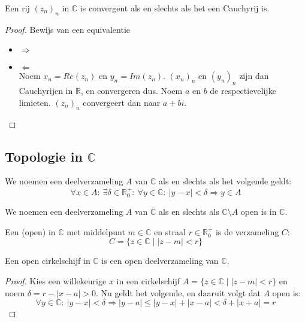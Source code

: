 \documentclass[main.tex]{subfiles}
\begin{document}
\begin{st}
  Een rij $(z_{n})_{n}$ in $\mathbb{C}$ is convergent als en slechts als het een Cauchyrij is.

  \begin{proof}
    Bewijs van een equivalentie\\
    \begin{itemize}
    \item $\Rightarrow$\\
    \item $\Leftarrow$\\
      Noem $x_{n} = Re(z_{n})$ en $y_{n} = Im(z_{n})$.
      $(x_{n})_{n}$ en $(y_{n})_{n}$ zijn dan Cauchyrijen in $\mathbb{R}$, en convergeren dus.
      Noem $a$ en $b$ de respectievelijke limieten.
      $(z_{n})_{n}$ convergeert dan naar $a+bi$.
    \end{itemize}
  \end{proof}
\end{st}

\subsection{Topologie in $\mathbb{C}$}
\label{sec:topologie-mathbbc}

\begin{de}
  We noemen een deelverzameling $A$ van $\mathbb{C}$  als en slechts als het volgende geldt:
  \[ \forall x\in A:\ \exists \delta \in \mathbb{R}_{0}^{+}:\ \forall y\in \mathbb{C}:\ |y-x| < \delta \Rightarrow y \in A \]
\end{de}

\begin{de}
  We noemen een deelverzameling $A$ van $\mathbb{C}$  als en slechts als $\mathbb{C} \setminus A$ open is in $\mathbb{C}$.
\end{de}

\begin{de}
  Een (open)  in $\mathbb{C}$ met middelpunt $m\in \mathbb{C}$ en straal $r\in \mathbb{R}_{0}^{+}$ is de verzameling $C$:
  \[ C = \{ z \in \mathbb{C} \mid |z-m| < r \} \]
\end{de}

\begin{st}
  Een open cirkelschijf in $\mathbb{C}$ is een open deelverzameling van $\mathbb{C}$.

  \begin{proof}
    Kies een willekeurige $x$ in een cirkelschijf $A = \{ z \in \mathbb{C} \mid |z-m| < r \}$ en noem $\delta = r-|x-a| > 0$.
    Nu geldt het volgende, en daaruit volgt dat $A$ open is:
    \[ \forall y\in \mathbb{C}:\ |y-x|<\delta \Rightarrow |y-a| \le |y-x|+|x-a| < \delta + |x+a| = r \]
  \end{proof}
\end{st}
\end{document}
